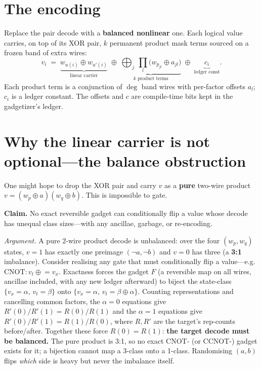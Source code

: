 \documentclass[11pt]{article}
\newcommand{\xor}{\oplus}
\begin{document}
\section{The encoding}

Replace the pair decode with a \textbf{balanced nonlinear} one. Each logical
value carries, on top of its XOR pair, $k$ permanent product mask terms sourced
on a frozen band of extra wires:
\[
v_i \;=\; \underbrace{w_{u(i)}\xor w_{u'(i)}}_{\text{linear carrier}}
\;\xor\; \underbrace{\bigoplus_{j}\ \prod_{l}\bigl(w_{p_{jl}}\xor a_{jl}\bigr)}_{k\text{ product terms}}
\;\xor\; \underbrace{c_i}_{\text{ledger const}} .
\]
Each product term is a conjunction of $\deg$ band wires with per-factor offsets
$a_l$; $c_i$ is a ledger constant. The offsets and $c$ are compile-time bits
kept in the gadgetizer's ledger.

\section{Why the linear carrier is not optional---the balance obstruction}

One might hope to drop the XOR pair and carry $v$ as a \textbf{pure} two-wire
product $v=(w_p\xor a)(w_q\xor b)$. This is impossible to gate.

\textbf{Claim.} No exact reversible gadget can conditionally flip a value whose
decode has unequal class sizes---with any ancillae, garbage, or re-encoding.

\emph{Argument.} A pure 2-wire product decode is unbalanced: over the four
$(w_p,w_q)$ states, $v=1$ has exactly one preimage $(\neg a,\neg b)$ and $v=0$
has three (a \textbf{3:1} imbalance). Consider realising any gate that must
conditionally flip a value---e.g.\ $\mathrm{CNOT}\colon v_t \mathrel{\xor}= v_x$.
Exactness forces the gadget $F$ (a reversible map on all wires, ancillae
included, with any new ledger afterward) to biject the state-class
$\{v_x=\alpha,\,v_t=\beta\}$ onto $\{v_x=\alpha,\,v_t=\beta\xor\alpha\}$.
Counting representations and cancelling common factors, the $\alpha=0$ equations
give $R'(0)/R'(1)=R(0)/R(1)$ and the $\alpha=1$ equations give
$R'(0)/R'(1)=R(1)/R(0)$, where $R,R'$ are the target's rep-counts before/after.
Together these force $R(0)=R(1)$: \textbf{the target decode must be balanced.}
The pure product is 3:1, so no exact CNOT- (or CCNOT-) gadget exists for it; a
bijection cannot map a 3-class onto a 1-class. Randomising $(a,b)$ flips
\emph{which} side is heavy but never the imbalance itself.
\end{document}
